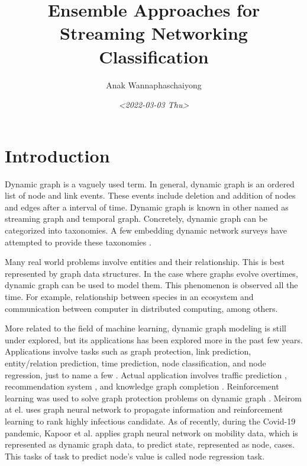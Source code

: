 \documentclass{IEEEtran}
\author{Anak Wannaphaschaiyong}
\date{\textit{<2022-03-03 Thu>}}
\title{Ensemble Approaches for Streaming Networking Classification}
\begin{document}
\maketitle

\section{Introduction}
\label{sec:org3e4788e}
Dynamic graph is a vaguely used term. In general, dynamic graph is an ordered list of node and link events. These events include deletion and addition of nodes and edges after a interval of time.
Dynamic graph is known in other named as streaming graph and temporal graph. Concretely, dynamic graph can be categorized into taxonomies. A few embedding dynamic network surveys have attempted to provide these taxonomies \cite{barrosSurveyEmbeddingDynamic2021,kazemiRepresentationLearningDynamica,skardingFoundationsModelingDynamic2021}.

Many real world problems involve entities and their relationship. This is best represented by graph data structures. In the case where graphs evolve overtimes, dynamic graph can be used to model them. This phenomenon is observed all the time. For example, relationship between species in an ecosystem and communication between computer in distributed computing, among others.

More related to the field of machine learning, dynamic graph modeling is still under explored, but its applications has been explored more in the past few years. Applications involve tasks such as graph protection, link prediction, entity/relation prediction, time prediction, node classification, and node regression, just to name a few \cite{kazemiRepresentationLearningDynamica}. Actual application involves traffic prediction \cite{yuanSurveyTrafficPrediction2021}, recommendation system \cite{kazemiRepresentationLearningDynamica}, and knowledge graph completion \cite{cai2022temporal}. Reinforcement learning was used to solve graph protection problems on dynamic graph \cite{wijayanto2018learning,wijayanto2019effective}. Meirom at el. \cite{meirom2021controlling} uses graph neural network to propagate information and reinforcement learning to rank highly infectious candidate. As of recently, during the Covid-19 pandemic, Kapoor et al. \cite{kapoor2020examining}  applies graph neural network on mobility data, which is represented as dynamic graph data, to predict state, represented as node, cases. This tasks of task to predict node's value is called node regression task.
\end{document}
